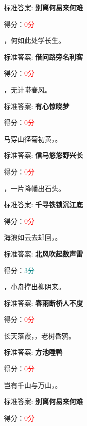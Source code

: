 \documentclass[12pt, a4paper, addpoints, answers]{exam}
\begin{document}
\begin{questions}
标准答案: \textbf{别离何易来何难}   

得分：\textcolor{red}{0分} 

\question[3] \fillin ，何如此处学长生。

标准答案: \textbf{借问路旁名利客}   

得分：\textcolor{red}{0分} 

\question[3] \fillin ，无计啭春风。

标准答案: \textbf{有心惊晓梦}   

得分：\textcolor{red}{0分} 

\question[3] 马穿山径菊初黄，\fillin 。

标准答案: \textbf{信马悠悠野兴长}   

得分：\textcolor{red}{0分} 

\question[3] \fillin ，一片降幡出石头。

标准答案: \textbf{千寻铁锁沉江底}   

得分：\textcolor{red}{0分} 

\question[3] 海浪如云去却回，\fillin[北风吹起数声雷] 。

标准答案: \textbf{北风吹起数声雷}   

得分：\textcolor{teal}{3分} 

\question[3] \fillin[春水断桥人不度] ，小舟撑出柳阴来。

标准答案: \textbf{春雨断桥人不度}   

得分：\textcolor{red}{0分} 

\question[3] 长天落霞，\fillin ，老树昏鸦。

标准答案: \textbf{方池睡鸭}   

得分：\textcolor{red}{0分} 

\question[3] 岂有千山与万山，\fillin 。

标准答案: \textbf{别离何易来何难}   

得分：\textcolor{red}{0分} 
\end{questions}

\hspace{5cm}
\end{document}
